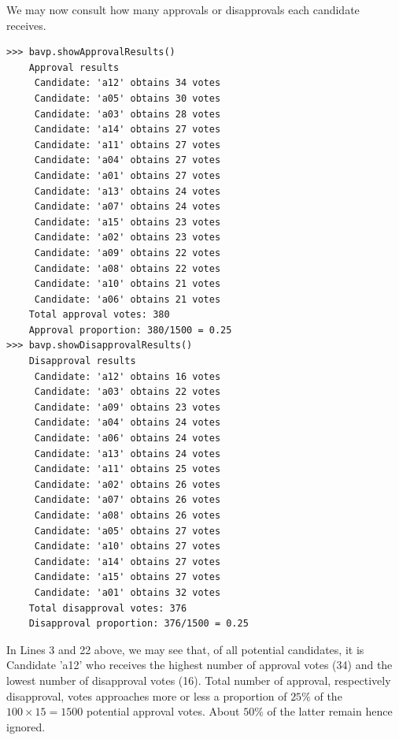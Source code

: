 We may now consult how many approvals or disapprovals each candidate receives.
\begin{lstlisting}
>>> bavp.showApprovalResults()
    Approval results
     Candidate: 'a12' obtains 34 votes
     Candidate: 'a05' obtains 30 votes
     Candidate: 'a03' obtains 28 votes
     Candidate: 'a14' obtains 27 votes
     Candidate: 'a11' obtains 27 votes
     Candidate: 'a04' obtains 27 votes
     Candidate: 'a01' obtains 27 votes
     Candidate: 'a13' obtains 24 votes
     Candidate: 'a07' obtains 24 votes
     Candidate: 'a15' obtains 23 votes
     Candidate: 'a02' obtains 23 votes
     Candidate: 'a09' obtains 22 votes
     Candidate: 'a08' obtains 22 votes
     Candidate: 'a10' obtains 21 votes
     Candidate: 'a06' obtains 21 votes
    Total approval votes: 380
    Approval proportion: 380/1500 = 0.25
>>> bavp.showDisapprovalResults()
    Disapproval results
     Candidate: 'a12' obtains 16 votes
     Candidate: 'a03' obtains 22 votes
     Candidate: 'a09' obtains 23 votes
     Candidate: 'a04' obtains 24 votes
     Candidate: 'a06' obtains 24 votes
     Candidate: 'a13' obtains 24 votes
     Candidate: 'a11' obtains 25 votes
     Candidate: 'a02' obtains 26 votes
     Candidate: 'a07' obtains 26 votes
     Candidate: 'a08' obtains 26 votes
     Candidate: 'a05' obtains 27 votes
     Candidate: 'a10' obtains 27 votes
     Candidate: 'a14' obtains 27 votes
     Candidate: 'a15' obtains 27 votes
     Candidate: 'a01' obtains 32 votes
    Total disapproval votes: 376
    Disapproval proportion: 376/1500 = 0.25
\end{lstlisting}
In Lines 3 and 22 above, we may see that, of all potential candidates, it is Candidate 'a12' who receives the highest number of approval votes (34) and the lowest number of disapproval votes (16). Total number of approval, respectively disapproval, votes approaches more or less a proportion of $25\%$ of the $100 \times 15 = 1500$ potential approval votes. About $50\%$ of the latter remain hence ignored. 

